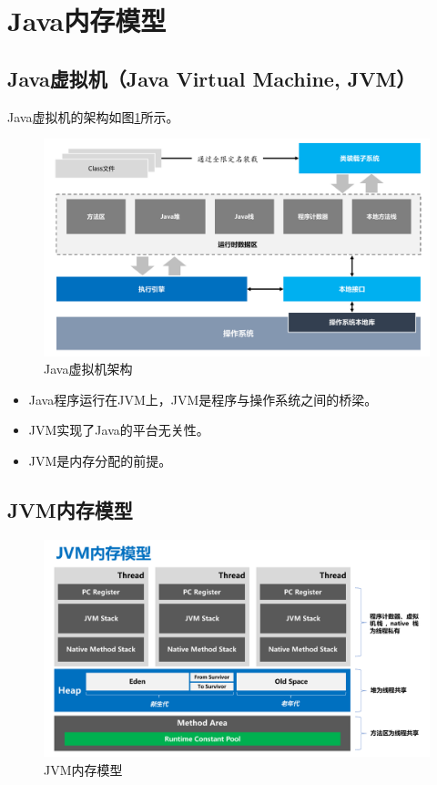 \section{Java内存模型}

\subsection{Java虚拟机（Java Virtual Machine, JVM）}

Java虚拟机的架构如图\ref{fig:jvm-arch}所示。

\begin{figure}[htb]
  \centering
  \includegraphics[width=\textwidth]{images/Java-memory-allocation/fig-jvm-arch.pdf}
  \caption{Java虚拟机架构}
  \label{fig:jvm-arch}
\end{figure}

\begin{itemize}
\item Java程序运行在JVM上，JVM是程序与操作系统之间的桥梁。
\item JVM实现了Java的平台无关性。
\item JVM是内存分配的前提。
\end{itemize}

\subsection{JVM内存模型}

\begin{figure}[htb]
  \centering
  \includegraphics[width=\textwidth]{images/Java-memory-allocation/fig-java-memory-arch.pdf}
  \caption{JVM内存模型}
  \label{fig:java-memory-arch}
\end{figure}

